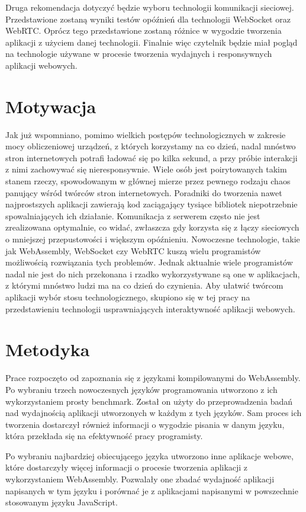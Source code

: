 \documentclass[language=polish,type=master]{aghmodern}
\begin{document}
Druga rekomendacja dotyczyć będzie wyboru technologii komunikacji sieciowej.
Przedstawione zostaną wyniki testów opóźnień dla technologii WebSocket oraz WebRTC.
Oprócz tego przedstawione zostaną różnice w wygodzie tworzenia aplikacji z użyciem danej technologii.
Finalnie więc czytelnik będzie miał pogląd na technologie używane w procesie tworzenia wydajnych i responsywnych aplikacji webowych.

\section{Motywacja}
Jak już wspomniano, pomimo wielkich postępów technologicznych w zakresie mocy obliczeniowej urządzeń, z których korzystamy na co dzień, nadal mnóstwo stron internetowych potrafi ładować się po kilka sekund, a przy próbie interakcji z nimi zachowywać się nieresponsywnie.
Wiele osób jest poirytowanych takim stanem rzeczy, spowodowanym w głównej mierze przez pewnego rodzaju chaos panujący wśród twórców stron internetowych.
Poradniki do tworzenia nawet najprostszych aplikacji zawierają kod zaciągający tysiące bibliotek niepotrzebnie spowalniających ich działanie.
Komunikacja z serwerem często nie jest zrealizowana optymalnie, co widać, zwłaszcza gdy korzysta się z łączy sieciowych o mniejszej przepustowości i większym opóźnieniu.
Nowoczesne technologie, takie jak WebAssembly, WebSocket czy WebRTC kuszą wielu programistów możliwością rozwiązania tych problemów.
Jednak aktualnie wiele programistów nadal nie jest do nich przekonana i rzadko wykorzystywane są one w aplikacjach, z którymi mnóstwo ludzi ma na co dzień do czynienia.
Aby ułatwić twórcom aplikacji wybór stosu technologicznego, skupiono się w tej pracy na przedstawieniu technologii usprawniających interaktywność aplikacji webowych.

\section{Metodyka}
Prace rozpoczęto od zapoznania się z językami kompilowanymi do WebAssembly.
Po wybraniu trzech nowoczesnych języków programowania utworzono z ich wykorzystaniem prosty benchmark.
Został on użyty do przeprowadzenia badań nad wydajnością aplikacji utworzonych w każdym z tych języków.
Sam proces ich tworzenia dostarczył również informacji o wygodzie pisania w danym języku, która przekłada się na efektywność pracy programisty.

Po wybraniu najbardziej obiecującego języka utworzono inne aplikacje webowe, które dostarczyły więcej informacji o procesie tworzenia aplikacji z wykorzystaniem WebAssembly.
Pozwalały one zbadać wydajność aplikacji napisanych w tym języku i porównać je z aplikacjami napisanymi w powszechnie stosowanym języku JavaScript.
\end{document}
